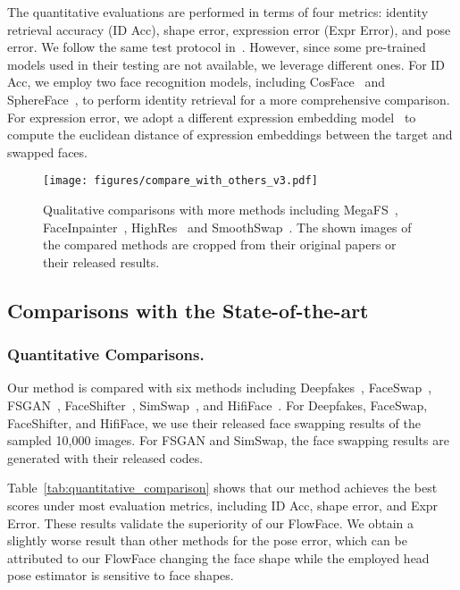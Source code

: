  The quantitative evaluations are performed in terms of four metrics: identity retrieval accuracy (ID Acc), shape error, expression error (Expr Error), and pose error.
We follow the same test protocol in~\cite{li2019faceshifter,wang2021hififace}. However, since some pre-trained models used in their testing are not available, we leverage different ones. For ID Acc, we employ two face recognition models, including CosFace~\cite{wang2018cosface} and SphereFace~\cite{liu2017sphereface}, to perform identity retrieval for a more comprehensive comparison. For expression error, we adopt a different expression embedding model~\cite{vemulapalli2019compact} to compute the euclidean distance of expression embeddings between the target and swapped faces.

\begin{figure*}[t]
\centering
\texttt{[image: figures/compare\_with\_others\_v3.pdf]}
\caption{Qualitative comparisons with more methods including  MegaFS~\cite{zhu2021one}, FaceInpainter~\cite{li2021faceinpainter}, HighRes~\cite{xu2022high} and SmoothSwap~\cite{kim2022smooth}. The shown images of the compared methods are cropped from their original papers or their released results.
}
\label{fig:additional_qualitative}
\end{figure*}

\subsection{Comparisons with the State-of-the-art}

\subsubsection{Quantitative Comparisons.} 
Our method is compared with six methods including Deepfakes~\cite{deepfakes}, FaceSwap~\cite{faceswap}, FSGAN~\cite{nirkin2019fsgan}, FaceShifter~\cite{li2019faceshifter}, SimSwap~\cite{chen2020simswap},  and HifiFace~\cite{wang2021hififace}.
For Deepfakes, FaceSwap, FaceShifter, and HifiFace, we use their released face swapping results of the sampled 10,000 images. For FSGAN and SimSwap, the face swapping results are generated with their released codes. 

Table~\ref{tab:quantitative_comparison} shows that our method achieves the best scores under most evaluation metrics, including ID Acc, shape error, and Expr Error. These results validate the superiority of our FlowFace. We obtain a slightly worse result than other methods for the pose error, which can be attributed to our FlowFace changing the face shape while the employed head pose estimator is sensitive to face shapes.

